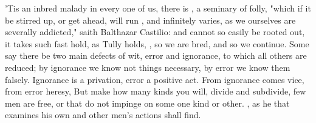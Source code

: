 
'Tis an inbred malady in every one of us, there is ,
a seminary of folly, "which if it be stirred up, or get ahead, will run , and infinitely varies, as we ourselves are severally addicted,"
saith Balthazar Castilio: and cannot so easily be rooted
out, it takes such fast hold, as Tully holds, ,
so we are bred, and so we continue. Some say there be two
main defects of wit, error and ignorance, to which all others are reduced; by
ignorance we know not things necessary, by error we know them falsely.
Ignorance is a privation, error a positive act. From ignorance comes vice, from
error heresy, \etc{} But make how many kinds you will, divide and subdivide,
few men are free, or that do not impinge on some one kind or other.
, as he that
examines his own and other men's actions shall find.

